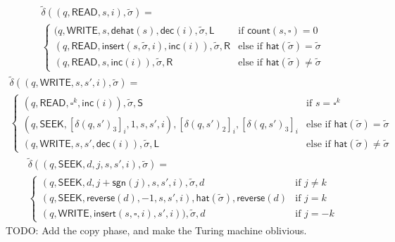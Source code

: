 \documentclass[12pt]{article}
\begin{document}
\begin{multline*}
\tilde{\delta}((q, \textsf{READ}, s, i), \tilde{\sigma}) = \\
\begin{cases}
(q, \textsf{WRITE}, s, \textsf{dehat}(s), \textsf{dec}(i), \tilde{\sigma}, \textsf{L} & \text{if } \textsf{count}(s, \square) = 0 \\
(q, \textsf{READ}, \textsf{insert}(s,\tilde{\sigma},i), \textsf{inc}(i)), \tilde{\sigma}, \textsf{R} & \text{else if } \textsf{hat}(\tilde{\sigma}) = \tilde{\sigma} \\
(q, \textsf{READ}, s, \textsf{inc}(i)), \tilde{\sigma}, \textsf{R} & \text{else if } \textsf{hat}(\tilde{\sigma}) \neq \tilde{\sigma}
\end{cases}
\end{multline*}
\begin{multline*}
\tilde{\delta}((q, \textsf{WRITE}, s, s', i), \tilde{\sigma}) = \\
\begin{cases}
(q, \textsf{READ}, \square^k, \textsf{inc}(i)), \tilde{\sigma}, \textsf{S} & \text{if } s = \square^k \\
(q, \textsf{SEEK}, [\delta(q, s')_3]_i, 1, s, s', i), [\delta(q, s')_2]_i, [\delta(q, s')_3]_i & \text{else if } \textsf{hat}(\tilde{\sigma}) = \tilde{\sigma} \\
(q, \textsf{WRITE}, s, s', \textsf{dec}(i)), \tilde{\sigma}, \textsf{L} & \text{else if } \textsf{hat}(\tilde{\sigma}) \neq \tilde{\sigma}
\end{cases}
\end{multline*}
\begin{multline*}
\tilde{\delta}((q, \textsf{SEEK}, d, j, s, s', i), \tilde{\sigma}) = \\
\begin{cases}
(q, \textsf{SEEK}, d, j+\textsf{sgn}(j), s, s', i), \tilde{\sigma}, d & \text{if } j \neq k \\
(q, \textsf{SEEK}, \textsf{reverse}(d), -1, s, s', i), \textsf{hat}(\tilde{\sigma}), \textsf{reverse}(d) & \text{if } j = k \\
(q, \textsf{WRITE}, \textsf{insert}(s, \square, i), s', i)), \tilde{\sigma}, d & \text{if } j = -k
\end{cases}
\end{multline*}
TODO: Add the copy phase, and make the Turing machine oblivious. 
\end{document}
